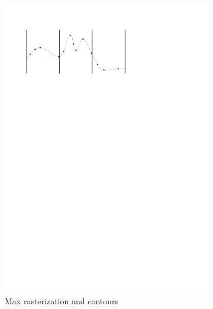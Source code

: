 \begin{figure}
\begin{subfigure}[b]{0.3\linewidth}
    \includegraphics[width=\textwidth,page=3]{figs/maxgridding.pdf}
    \caption{Max rasterization and contours}\label{fig:fr:mg:b}
  \end{subfigure}
  \qquad
  \begin{subfigure}[b]{0.3\linewidth}
    \centering

\end{subfigure}
\end{figure}
